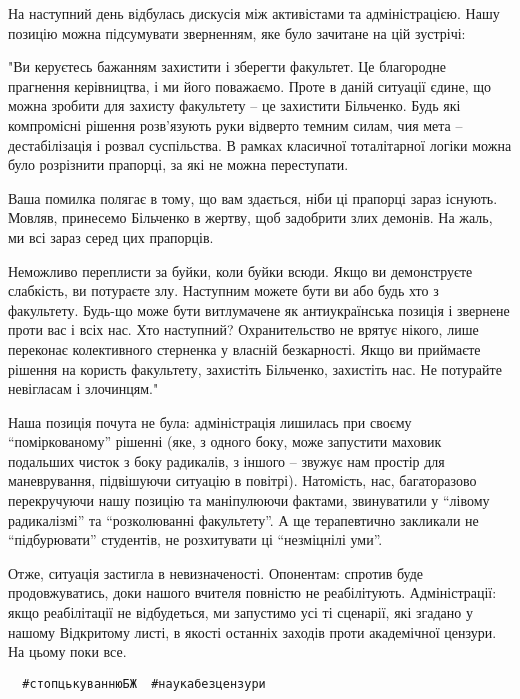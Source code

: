 На наступний день відбулась дискусія між активістами та адміністрацією. Нашу
позицію можна підсумувати зверненням, яке було зачитане на цій зустрічі: 

"Ви керуєтесь бажанням захистити і зберегти факультет. Це благородне прагнення
керівництва, і ми його поважаємо. Проте в даній ситуації єдине, що можна
зробити для захисту факультету – це захистити Більченко. Будь які компромісні
рішення розв'язують руки відверто темним силам, чия мета – дестабілізація і
розвал суспільства. В рамках класичної тоталітарної логіки можна було
розрізнити прапорці, за які не можна переступати. 

Ваша помилка полягає в тому,
що вам здається, ніби ці прапорці зараз існують. Мовляв, принесемо Більченко в
жертву, щоб задобрити злих демонів. На жаль, ми всі зараз серед цих прапорців.

Неможливо переплисти за буйки, коли буйки всюди. Якщо ви демонструєте
слабкість, ви потураєте злу. Наступним можете бути ви або будь хто з
факультету. Будь-що може бути витлумачене як антиукраїнська позиція і звернене
проти вас і всіх нас. Хто наступний? Охранительство не врятує нікого, лише
переконає колективного стерненка у власній безкарності. Якщо ви приймаєте
рішення на користь факультету, захистіть Більченко, захистіть нас. Не потурайте
невігласам і злочинцям."

Наша позиція почута не була: адміністрація лишилась при своєму
\enquote{поміркованому} рішенні (яке, з одного боку, може запустити маховик
подальших чисток з боку радикалів, з іншого – звужує нам простір для
маневрування, підвішуючи ситуацію в повітрі). Натомість, нас, багаторазово
перекручуючи нашу позицію та маніпулюючи фактами, звинуватили у \enquote{лівому
радикалізмі} та \enquote{розколюванні факультету}. А ще терапевтично закликали
не \enquote{підбурювати} студентів, не розхитувати ці \enquote{незміцнілі уми}.

Отже, ситуація застигла в невизначеності. Опонентам: спротив буде
продовжуватись, доки нашого вчителя повністю не реабілітують. Адміністрації:
якщо реабілітації не відбудеться, ми запустимо усі ті сценарії, які згадано у
нашому Відкритому листі, в якості останніх заходів проти академічної цензури.
На цьому поки все.

\begin{verbatim}
  #стопцькуваннюБЖ  #наукабезцензури
\end{verbatim}

